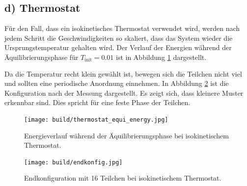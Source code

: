 \FloatBarrier
 \subsection*{d) Thermostat}

Für den Fall, dass ein isokinetisches Thermostat verwendet wird, werden nach jedem Schritt die Geschwindigkeiten so skaliert, dass das System wieder die Ursprungstemperatur gehalten wird.
Der Verlauf der Energien während der Äquilibrierungsphase für $T_\text{init} = 0.01$ ist in Abbildung \ref{fig:thermostat_equi_energy}   dargestellt.

Da die Temperatur recht klein gewählt ist, bewegen sich die Teilchen nicht viel
und sollten eine periodische Anordnung einnehmen.
In Abbildung \ref{fig:endkonfig} ist die Konfiguration nach der Messung dargestellt.
Es zeigt sich, dass kleinere Muster erkennbar sind.
Dies spricht für eine feste Phase der Teilchen.
\begin{figure}
    \centering
    \texttt{[image: build/thermostat\_equi\_energy.jpg]}
    \caption{Energieverlauf während der Äquilibrierungsphase bei isokinetischem Thermostat.}
    \label{fig:thermostat_equi_energy}
\end{figure}
\begin{figure}
    \centering
    \texttt{[image: build/endkonfig.jpg]}
    \caption{Endkonfiguration mit 16 Teilchen bei isokinetischem Thermostat.}
    \label{fig:endkonfig}
\end{figure}
